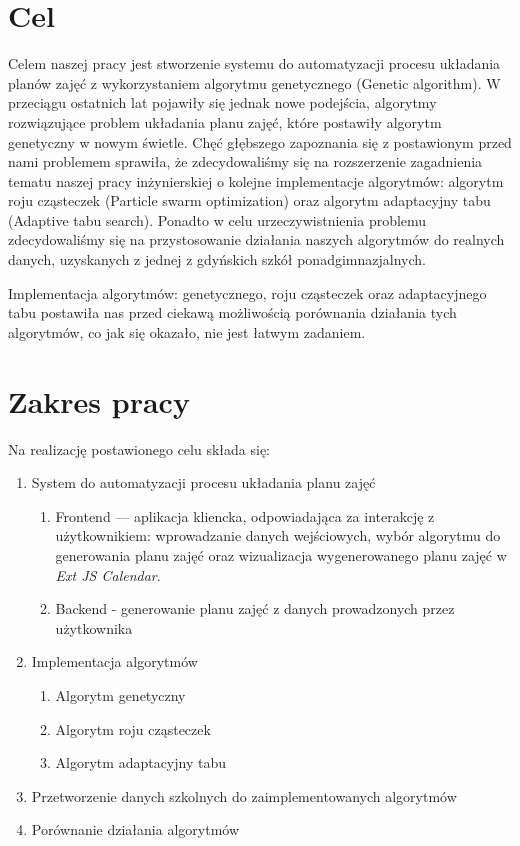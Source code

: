 \section{Cel}
\par Celem naszej pracy jest stworzenie systemu do automatyzacji procesu układania planów zajęć z wykorzystaniem algorytmu genetycznego (Genetic algorithm). W przeciągu ostatnich lat pojawiły się jednak nowe podejścia, algorytmy rozwiązujące problem układania planu zajęć, które postawiły algorytm genetyczny w nowym świetle. Chęć głębszego zapoznania się z postawionym przed nami problemem sprawiła, że zdecydowaliśmy się na rozszerzenie zagadnienia tematu naszej pracy inżynierskiej o kolejne implementacje algorytmów: algorytm roju cząsteczek (Particle swarm optimization) oraz algorytm adaptacyjny tabu (Adaptive tabu search). Ponadto w celu urzeczywistnienia problemu zdecydowaliśmy się na przystosowanie działania naszych algorytmów do realnych danych, uzyskanych z jednej z gdyńskich szkół ponadgimnazjalnych.
\par Implementacja algorytmów: genetycznego, roju cząsteczek oraz adaptacyjnego tabu postawiła nas przed ciekawą możliwością porównania działania tych algorytmów, co jak się okazało, nie jest łatwym zadaniem.
\section{Zakres pracy}
\par Na realizację postawionego celu składa się:
\begin{enumerate}
\item System do automatyzacji procesu układania planu zajęć
\begin{enumerate}
\item Frontend — aplikacja kliencka, odpowiadająca za interakcję z użytkownikiem: wprowadzanie danych wejściowych, wybór algorytmu do generowania planu zajęć oraz wizualizacja wygenerowanego planu zajęć w \emph{Ext JS Calendar}.
\item Backend - generowanie planu zajęć z danych prowadzonych przez użytkownika 
\end{enumerate}
\item Implementacja algorytmów
\begin{enumerate}
\item Algorytm genetyczny
\item Algorytm roju cząsteczek
\item Algorytm adaptacyjny tabu
\end{enumerate}
\item Przetworzenie danych szkolnych do zaimplementowanych algorytmów
\item Porównanie działania algorytmów

\end{enumerate}


